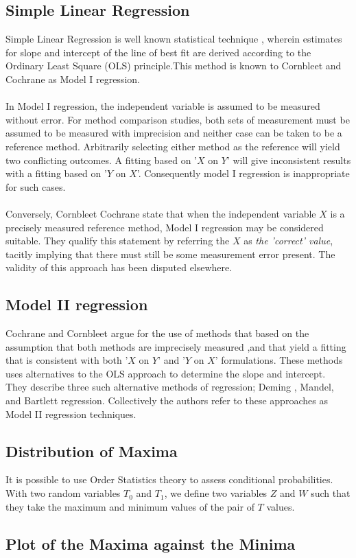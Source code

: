 \documentclass[12pt, a4paper]{report}
\begin{document}
\subsection{Simple Linear Regression} Simple Linear Regression is  well
known statistical technique , wherein estimates for slope and
intercept of the line of best fit are derived according to the
Ordinary Least Square (OLS) principle.This method is known to
Cornbleet and Cochrane as Model I regression.
\\
\\
In Model I regression, the independent variable is assumed to be
measured without error. For method comparison studies, both sets
of measurement must be assumed to be measured with imprecision and
neither case can be taken to be a reference method. Arbitrarily
selecting either method as the reference will yield two
conflicting outcomes. A fitting based on '$X$ on $Y$' will give
inconsistent results with a fitting based on '$Y$ on $X$'.
Consequently model I regression is inappropriate for such cases.
\\
\\
Conversely, Cornbleet Cochrane state that when the independent
variable $X$ is a precisely measured reference method, Model I
regression may be considered suitable. They qualify this statement
by referring the $X$ as \emph{the 'correct' value}, tacitly
implying that there must still be some measurement error present.
The validity of this approach has been disputed elsewhere.




\subsection{Model II regression}
Cochrane and Cornbleet argue for the use of methods that based on
the assumption that both methods are imprecisely measured ,and
that yield a fitting that is consistent with both '$X$ on $Y$' and
'$Y$ on $X$' formulations. These methods uses alternatives to the
OLS approach to determine the slope and intercept.
\\
They describe three such alternative methods of regression; Deming
, Mandel, and Bartlett regression. Collectively the authors refer
to these approaches as Model II regression techniques.


\subsection{Distribution of Maxima} It is possible to use Order
Statistics theory to assess conditional probabilities. With two
random variables $T_{0}$ and $T_{1}$, we define two variables $Z$
and $W$ such that they take the maximum and minimum values of the
pair of $T$ values.\subsection{Plot of the Maxima against the
Minima}
\end{document}
